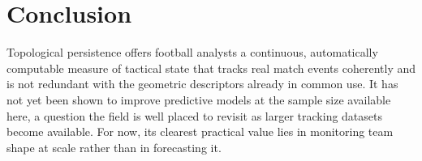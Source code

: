 \section{Conclusion}

Topological persistence offers football analysts a continuous,
automatically computable measure of tactical state that tracks real
match events coherently and is not redundant with the geometric
descriptors already in common use. It has not yet been shown to improve
predictive models at the sample size available here, a question the
field is well placed to revisit as larger tracking datasets become
available. For now, its clearest practical value lies in monitoring
team shape at scale rather than in forecasting it.
